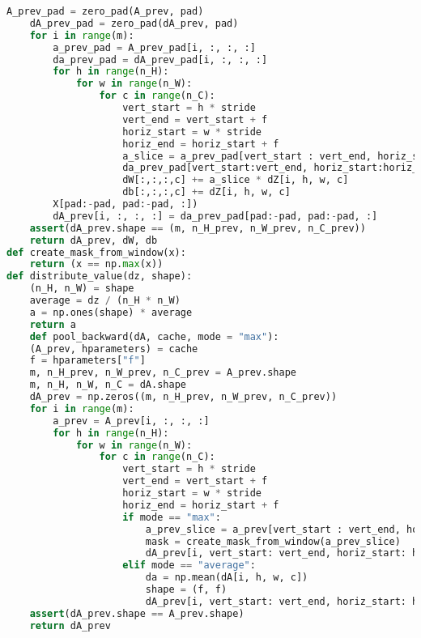 \begin{lstlisting}[language=Python]
    A_prev_pad = zero_pad(A_prev, pad)
    dA_prev_pad = zero_pad(dA_prev, pad)
    for i in range(m):
        a_prev_pad = A_prev_pad[i, :, :, :]
        da_prev_pad = dA_prev_pad[i, :, :, :]
        for h in range(n_H):
            for w in range(n_W):
                for c in range(n_C):
                    vert_start = h * stride
                    vert_end = vert_start + f
                    horiz_start = w * stride
                    horiz_end = horiz_start + f
                    a_slice = a_prev_pad[vert_start : vert_end, horiz_start : horiz_end, :]
                    da_prev_pad[vert_start:vert_end, horiz_start:horiz_end, :] += W[:,:,:,c] * dZ[i, h, w, c]
                    dW[:,:,:,c] += a_slice * dZ[i, h, w, c]
                    db[:,:,:,c] += dZ[i, h, w, c]
        X[pad:-pad, pad:-pad, :])
        dA_prev[i, :, :, :] = da_prev_pad[pad:-pad, pad:-pad, :]
    assert(dA_prev.shape == (m, n_H_prev, n_W_prev, n_C_prev))
    return dA_prev, dW, db
def create_mask_from_window(x):
    return (x == np.max(x))
def distribute_value(dz, shape):
    (n_H, n_W) = shape
    average = dz / (n_H * n_W)
    a = np.ones(shape) * average
    return a
    def pool_backward(dA, cache, mode = "max"):
    (A_prev, hparameters) = cache
    f = hparameters["f"]
    m, n_H_prev, n_W_prev, n_C_prev = A_prev.shape
    m, n_H, n_W, n_C = dA.shape
    dA_prev = np.zeros((m, n_H_prev, n_W_prev, n_C_prev))
    for i in range(m):
        a_prev = A_prev[i, :, :, :]
        for h in range(n_H):  
            for w in range(n_W): 
                for c in range(n_C):
                    vert_start = h * stride
                    vert_end = vert_start + f
                    horiz_start = w * stride
                    horiz_end = horiz_start + f
                    if mode == "max":
                        a_prev_slice = a_prev[vert_start : vert_end, horiz_start : horiz_end, c]
                        mask = create_mask_from_window(a_prev_slice)
                        dA_prev[i, vert_start: vert_end, horiz_start: horiz_end, c] += mask * dA[i, h, w, c]
                    elif mode == "average":
                        da = np.mean(dA[i, h, w, c])
                        shape = (f, f)
                        dA_prev[i, vert_start: vert_end, horiz_start: horiz_end, c] += distribute_value(da, shape)
    assert(dA_prev.shape == A_prev.shape)
    return dA_prev
\end{lstlisting}